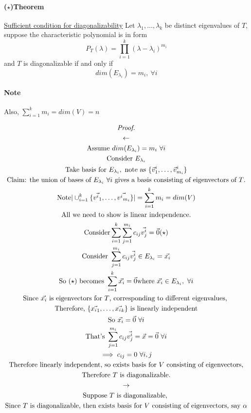 \documentclass[11pt]{article}
\newcommand{\vset}[3]{\{\vec{{#1}_{#2}}, \dots, \vec{{#1}_{#3}}\}}
\begin{document}
	\paragraph{($\star$)Theorem} \underline{Sufficient condition for diagonalizability} Let $\lambda_1, \dots, \lambda_k$ be distinct eigenvalues of $T$, suppose the characteristic polynomial is in form 
	\[
		P_T(\lambda) = \prod_{i=1}^k {(\lambda - \lambda_i)^{m_i}}
	\]
	and $T$ is diagonalizable if and only if 
	\[
		dim(E_{\lambda_i}) = m_i,\ \forall i
	\]
	\paragraph{Note} Also, $\sum_{i=1}^k{m_i} = dim(V) = n$
	
	\begin{multline*}
		\emph{Proof.} \\
		\leftarrow \\
		\text{Assume } dim(E_{\lambda_i}) = m_i\ \forall i \\
		\text{Consider } E_{\lambda_i} \\
		\text{Take basis for }E_{\lambda_i}, \text{ note as } 
		\{ \vec{v}_1^i, \dots, \vec{v}_{m_i}^i
		\}\\
		\text{Claim: the union of bases of $E_{\lambda_i}\ \forall i$ gives a basis consisting of eigenvectors of $T$.} \\
		\text{Note} \vert \cup_{i=1}^k {\vset{v^i}{1}{m_i}} \vert = \sum_{i=1}^k{m_i} = dim(V) \\
		\text{All we need to show is linear independence.} \\
		\text{Consider}
		\sum_{i=1}^k{\sum_{j=1}^{m_i}{c_{ij}\vec{v_j^i}}} = \vec{0} (\star) \\
		\text{Consider } \sum_{j=1}^{m_i}{c_{ij}\vec{v_j^i}} \in E_{\lambda_i} = \vec{x_i}\\
		\text{So $(\star)$ becomes } \sum_{i=1}^k{\vec{x_i}} = \vec{0} \text{where } \vec{x_i} \in E_{\lambda_i},\ \forall i \\ 
		\text{Since $\vec{x_i}$ is eigenvectors for $T$, corresponding to different eigenvalues, } \\
		\text{Therefore, } \vset{x_i}{1}{k} \text{ is linearly independent} \\
		\text{So } \vec{x_i} = \vec{0}\ \forall i \\
		\text{That's } \sum_{j=1}^{m_i}{c_{ij}\vec{v_j^i}} = \vec{x} = \vec{0}\ \forall i\\
		\implies c_{ij} = 0\ \forall i,j\\
		\text{Therefore linearly independent, so exists basis for $V$ consisting of eigenvectors,}\\
		\text{Therefore $T$ is diagonalizable.} \\
		\rightarrow \\
		\text{Suppose $T$ is diagonalizable, }\\
		\text{Since $T$ is diagonalizable, then exists basis for $V$ consisting of eigenvectors, say }\alpha \\
	\end{multline*}
\end{document}
